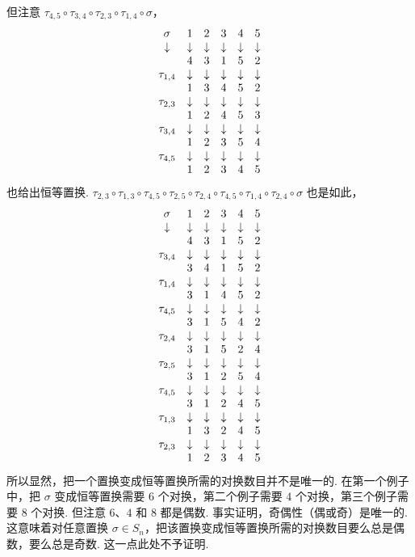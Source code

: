但注意 $\tau_{4,5}\circ\tau_{3,4}\circ\tau_{2,3}\circ\tau_{1,4}\circ\sigma$，
\[
\begin{array}{c c c c c c}
\sigma&1&2&3&4&5\\
\downarrow&\downarrow&\downarrow&\downarrow&\downarrow&\downarrow\\
&4&3&1&5&2\\
\tau_{1,4}&\downarrow&\downarrow&\downarrow&\downarrow&\downarrow\\
&1&3&4&5&2\\
\tau_{2,3}&\downarrow&\downarrow&\downarrow&\downarrow&\downarrow\\
&1&2&4&5&3\\
\tau_{3,4}&\downarrow&\downarrow&\downarrow&\downarrow&\downarrow\\
&1&2&3&5&4\\
\tau_{4,5}&\downarrow&\downarrow&\downarrow&\downarrow&\downarrow\\
&1&2&3&4&5
\end{array}
\]
也给出恒等置换. $\tau_{2,3}\circ\tau_{1,3}\circ\tau_{4,5}\circ\tau_{2,5}\circ\tau_{2,4}\circ\tau_{4,5}\circ\tau_{1,4}\circ\tau_{2,4}\circ\sigma$ 也是如此，
\[
\begin{array}{c c c c c c}
\sigma&1&2&3&4&5\\
\downarrow&\downarrow&\downarrow&\downarrow&\downarrow&\downarrow\\
&4&3&1&5&2\\
\tau_{3,4}&\downarrow&\downarrow&\downarrow&\downarrow&\downarrow\\
&3&4&1&5&2\\
\tau_{1,4}&\downarrow&\downarrow&\downarrow&\downarrow&\downarrow\\
&3&1&4&5&2\\
\tau_{4,5}&\downarrow&\downarrow&\downarrow&\downarrow&\downarrow\\
&3&1&5&4&2\\
\tau_{2,4}&\downarrow&\downarrow&\downarrow&\downarrow&\downarrow\\
&3&1&5&2&4\\
\tau_{2,5}&\downarrow&\downarrow&\downarrow&\downarrow&\downarrow\\
&3&1&2&5&4\\
\tau_{4,5}&\downarrow&\downarrow&\downarrow&\downarrow&\downarrow\\
&3&1&2&4&5\\
\tau_{1,3}&\downarrow&\downarrow&\downarrow&\downarrow&\downarrow\\
&1&3&2&4&5\\
\tau_{2,3}&\downarrow&\downarrow&\downarrow&\downarrow&\downarrow\\
&1&2&3&4&5
\end{array}
\]
所以显然，把一个置换变成恒等置换所需的对换数目并不是唯一的. 在第一个例子中，把 $\sigma$ 变成恒等置换需要 $6$ 个对换，第二个例子需要 $4$ 个对换，第三个例子需要 $8$ 个对换. 但注意 $6$、$4$ 和 $8$ 都是偶数. 事实证明，奇偶性（偶或奇）是唯一的. 这意味着对任意置换 $\sigma\in S_n$，把该置换变成恒等置换所需的对换数目要么总是偶数，要么总是奇数. 这一点此处不予证明.

